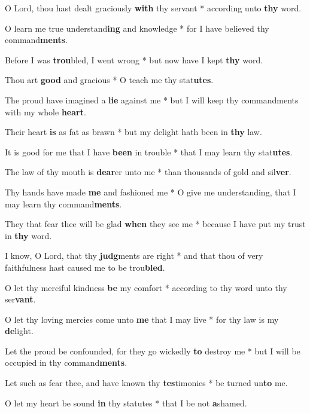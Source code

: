 \begin{multicols}{2}
	O Lord, thou hast dealt graciously \textbf{with} thy servant * according unto \textbf{thy} word.
	
	O learn me true understand\textbf{ing} and knowledge * for I have believed thy command\textbf{ments}.
	
	Before I was \textbf{trou}bled, I went wrong * but now have I kept \textbf{thy} word.
	
	Thou art \textbf{good} and gracious * O teach me thy stat\textbf{utes}.
	
	The proud have imagined a \textbf{lie} against me * but I will keep thy commandments with my whole \textbf{heart}.
	
	Their heart \textbf{is} as fat as brawn * but my delight hath been in \textbf{thy} law.
	
	It is good for me that I have \textbf{been} in trouble * that I may learn thy stat\textbf{utes}.
	
	The law of thy mouth is \textbf{dear}er unto me * than thousands of gold and sil\textbf{ver}.
	
	Thy hands have made \textbf{me} and fashioned me * O give me understanding, that I may learn thy command\textbf{ments}.
	
	They that fear thee will be glad \textbf{when} they see me * because I have put my trust in \textbf{thy} word.
	
	I know, O Lord, that thy \textbf{judg}ments are right * and that thou of very faithfulness hast caused me to be trou\textbf{bled}.
	
	O let thy merciful kindness \textbf{be} my comfort * according to thy word unto thy ser\textbf{vant}.
	
	O let thy loving mercies come unto \textbf{me} that I may live * for thy law is my \textbf{de}light.
	
	Let the proud be confounded, for they go wickedly \textbf{to} destroy me * but I will be occupied in thy command\textbf{ments}.
	
	Let such as fear thee, and have known thy \textbf{tes}timonies * be turned un\textbf{to} me.
	
	O let my heart be sound \textbf{in} thy statutes * that I be not \textbf{a}shamed.
\end{multicols}
